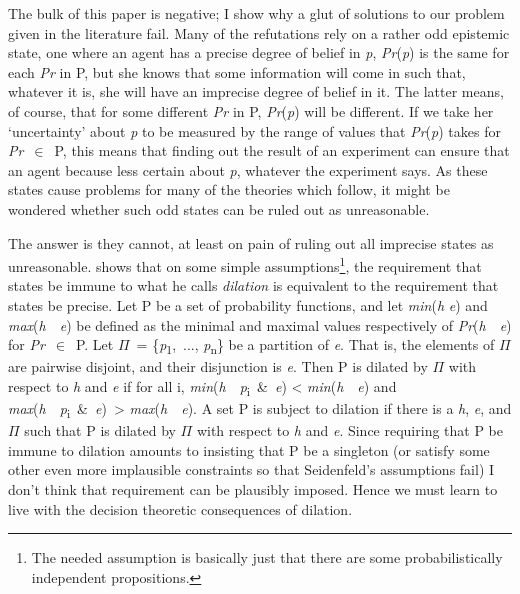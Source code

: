 The bulk of this paper is negative; I show why a glut of solutions to
our problem given in the literature fail. Many of the refutations rely
on a rather odd epistemic state, one where an agent has a precise degree
of belief in \emph{p}, \emph{Pr}(\emph{p}) is the same for each
\emph{Pr} in P, but she knows that some information will come in such
that, whatever it is, she will have an imprecise degree of belief in it.
The latter means, of course, that for some different \emph{Pr} in P,
\emph{Pr}(\emph{p}) will be different. If we take her `uncertainty'
about \emph{p} to be measured by the range of values that
\emph{Pr}(\emph{p}) takes for \emph{Pr}~$\in$~P, this means that finding out
the result of an experiment can ensure that an agent because less
certain about \emph{p}, whatever the experiment says. As these states
cause problems for many of the theories which follow, it might be
wondered whether such odd states can be ruled out as unreasonable.

The answer is they cannot, at least on pain of ruling out all imprecise
states as unreasonable. \citet{Seidenfeld1994} shows that on some simple
assumptions\footnote{The needed assumption is basically just that there
  are some probabilistically independent propositions.}, the requirement
that states be immune to what he calls \emph{dilation} is equivalent to
the requirement that states be precise. Let P be a set of probability
functions, and let \emph{min}(\emph{h} \textbar{} \emph{e}) and
\emph{max}(\emph{h}~\textbar{}~\emph{e}) be defined as the minimal and
maximal values respectively of \emph{Pr}(\emph{h}~\textbar{}~\emph{e})
for \emph{Pr}~$\in$~P. Let $\Pi$~= \{\emph{p}\textsubscript{1},~...,
\emph{p}\textsubscript{n}\} be a partition of \emph{e}. That is, the
elements of $\Pi$ are pairwise disjoint, and their disjunction is \emph{e}.
Then P is dilated by $\Pi$ with respect to \emph{h} and \emph{e} if for all
i, \emph{min}(\emph{h}~\textbar{}~\emph{p}\textsubscript{i}~\&~\emph{e})
\textless{} \emph{min}(\emph{h}~\textbar{}~\emph{e}) and
\emph{max}(\emph{h}~\textbar{}~\emph{p}\textsubscript{i}~\&~\emph{e})~\textgreater{}
\emph{max}(\emph{h}~\textbar{}~\emph{e}). A set P is subject to dilation
if there is a \emph{h}, \emph{e}, and $\Pi$ such that P is dilated by $\Pi$ with
respect to \emph{h} and \emph{e}. Since requiring that P be immune to
dilation amounts to insisting that P be a singleton (or satisfy some
other even more implausible constraints so that Seidenfeld's assumptions
fail) I don't think that requirement can be plausibly imposed. Hence we
must learn to live with the decision theoretic consequences of dilation.

